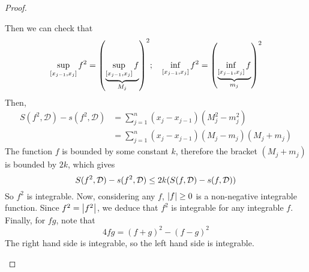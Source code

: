\begin{proof}
\begin{enumerate}[(1)]
		      Then we can check that
		      \[
			      \sup_{[x_{j-1}, x_j]} f^2 = \qty(\underbrace{\sup_{[x_{j-1}, x_j]} f}_{M_j})^2;\quad \inf_{[x_{j-1}, x_j]} f^2 = \qty(\underbrace{\inf_{[x_{j-1}, x_j]} f}_{m_j})^2
		      \]
		      Then,
		      \begin{align*}
			      S(f^2, \mathcal D) - s(f^2, \mathcal D) & = \sum_{j=1}^n (x_j - x_{j-1})(M_j^2 - m_j^2)        \\
			                                              & = \sum_{j=1}^n (x_j - x_{j-1})(M_j - m_j)(M_j + m_j)
		      \end{align*}
		      The function \(f\) is bounded by some constant \(k\), therefore the bracket \((M_j + m_j)\) is bounded by \(2k\), which gives
		      \[
			      S(f^2, \mathcal D) - s(f^2, \mathcal D) \leq 2k\qty(S(f, \mathcal D) - s(f, \mathcal D))
		      \]
		      So \(f^2\) is integrable.
		      Now, considering any \(f\), \(\abs{f} \geq 0\) is a non-negative integrable function.
		      Since \(f^2 = \abs{f^2}\), we deduce that \(f^2\) is integrable for any integrable \(f\).
		      Finally, for \(fg\), note that
		      \[
			      4fg = (f + g)^2 - (f - g)^2
		      \]
		      The right hand side is integrable, so the left hand side is integrable.
	\end{enumerate}
\end{proof}

